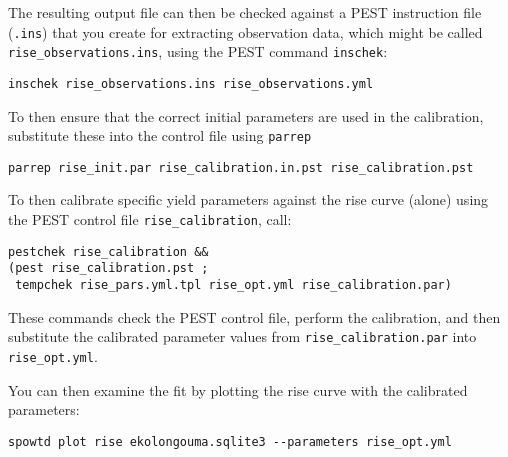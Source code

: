\documentclass[11pt,a4paper]{article}
\begin{document}
The resulting output file can then be checked against a PEST
instruction file (\texttt{.ins}) that you create for extracting
observation data, which might be called
\texttt{rise\_observations.ins}, using the PEST command
\texttt{inschek}:
\begin{lstlisting}[frame=single]
inschek rise_observations.ins rise_observations.yml
\end{lstlisting}

To then ensure that the correct initial parameters are used in the
calibration, substitute these into the control file using
\texttt{parrep}
\begin{lstlisting}[frame=single]
parrep rise_init.par rise_calibration.in.pst rise_calibration.pst
\end{lstlisting}

To then calibrate specific yield parameters against the rise curve
(alone) using the PEST control file \texttt{rise\_calibration}, call:
\begin{lstlisting}[frame=single]
pestchek rise_calibration &&
(pest rise_calibration.pst ;
 tempchek rise_pars.yml.tpl rise_opt.yml rise_calibration.par)
\end{lstlisting}
These commands check the PEST control file, perform the calibration,
and then substitute the calibrated parameter values from
\texttt{rise\_calibration.par} into \texttt{rise\_opt.yml}.

You can then examine the fit by plotting the rise curve with the
calibrated parameters:
\begin{lstlisting}[frame=single]
spowtd plot rise ekolongouma.sqlite3 --parameters rise_opt.yml
\end{lstlisting}
\end{document}
